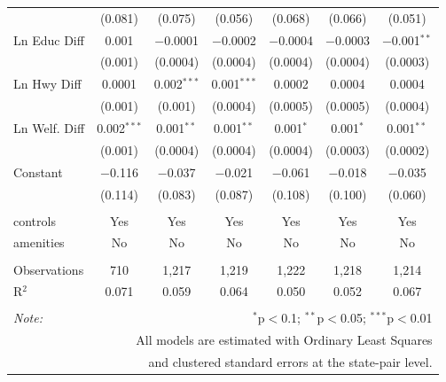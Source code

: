 \begin{table}[!htbp]
\begin{tabular}{@{\extracolsep{5pt}}lcccccc}
  & (0.081) & (0.075) & (0.056) & (0.068) & (0.066) & (0.051) \\ 
  Ln Educ Diff & 0.001 & $-$0.0001 & $-$0.0002 & $-$0.0004 & $-$0.0003 & $-$0.001$^{**}$ \\ 
  & (0.001) & (0.0004) & (0.0004) & (0.0004) & (0.0004) & (0.0003) \\ 
  Ln Hwy Diff & 0.0001 & 0.002$^{***}$ & 0.001$^{***}$ & 0.0002 & 0.0004 & 0.0004 \\ 
  & (0.001) & (0.001) & (0.0004) & (0.0005) & (0.0005) & (0.0004) \\ 
  Ln Welf. Diff & 0.002$^{***}$ & 0.001$^{**}$ & 0.001$^{**}$ & 0.001$^{*}$ & 0.001$^{*}$ & 0.001$^{**}$ \\ 
  & (0.001) & (0.0004) & (0.0004) & (0.0004) & (0.0003) & (0.0002) \\ 
  Constant & $-$0.116 & $-$0.037 & $-$0.021 & $-$0.061 & $-$0.018 & $-$0.035 \\ 
  & (0.114) & (0.083) & (0.087) & (0.108) & (0.100) & (0.060) \\ 
 \hline \\[-1.8ex] 
controls & Yes & Yes & Yes & Yes & Yes & Yes \\ 
amenities & No & No & No & No & No & No \\ 
\hline \\[-1.8ex] 
Observations & 710 & 1,217 & 1,219 & 1,222 & 1,218 & 1,214 \\ 
R$^{2}$ & 0.071 & 0.059 & 0.064 & 0.050 & 0.052 & 0.067 \\ 
\hline 
\hline \\[-1.8ex] 
\textit{Note:}  & \multicolumn{6}{r}{$^{*}$p$<$0.1; $^{**}$p$<$0.05; $^{***}$p$<$0.01} \\ 
 & \multicolumn{6}{r}{All models are estimated with Ordinary Least Squares} \\ 
 & \multicolumn{6}{r}{and clustered standard errors at the state-pair level.} \\ 
\end{tabular} 
\end{table} 
